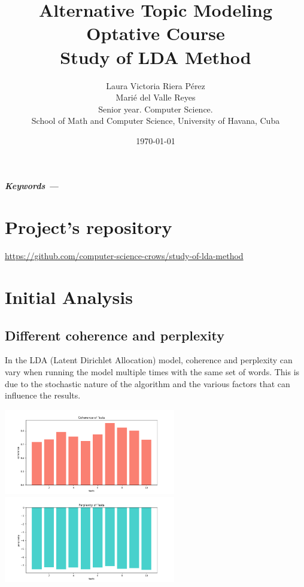 \documentclass[10pt]{article} %
\title{\normalsize{Alternative Topic Modeling Optative Course}\\
	\Huge\bfseries Study of LDA Method \\
} %
\author{%
	Laura Victoria Riera P\'erez\\
	Mari\'e del Valle Reyes \vspace{1em} \\
	\small Senior year. Computer Science. \\ %
	\small School of Math and Computer Science, University of Havana, Cuba \\ %
}
\date{\footnotesize \today } %
\providecommand{\keywords}[1]
{
	\small	
	\vspace{0.5em}
	\noindent \textbf{\textit{Keywords --- }} #1
}
\renewenvironment{abstract}
{\small
	\begin{center}
		\bfseries \abstractname\vspace{-.5em}\vspace{0pt}
	\end{center}
	\list{}{
		\setlength{\leftmargin}{1.5cm}%
		\setlength{\rightmargin}{\leftmargin}%
	}%
	\item\relax}
{\endlist}
\begin{document}
	\maketitle
	
	\begin{abstract}
		\lipsum[1]
		
		\keywords{}
	\end{abstract}

	\section*{Project's repository}
	
	\begin{center}
		\href{https://github.com/computer-science-crows/study-of-lda-method}{https://github.com/computer-science-crows/study-of-lda-method}
	\end{center}
	
	\section{Initial Analysis}
	
	\subsection{Different coherence and perplexity}
	
	In the LDA (Latent Dirichlet Allocation) model, coherence and perplexity can vary when running the model multiple times with the same set of words. This is due to the stochastic nature of the algorithm and the various factors that can influence the results.
	
		
	\begin{center}
		\includegraphics[width=7.5cm]{images/coherence_stopwords}
		\includegraphics[width=7.5cm]{images/perplexity_stopwords}
	\end{center}
\end{document}
